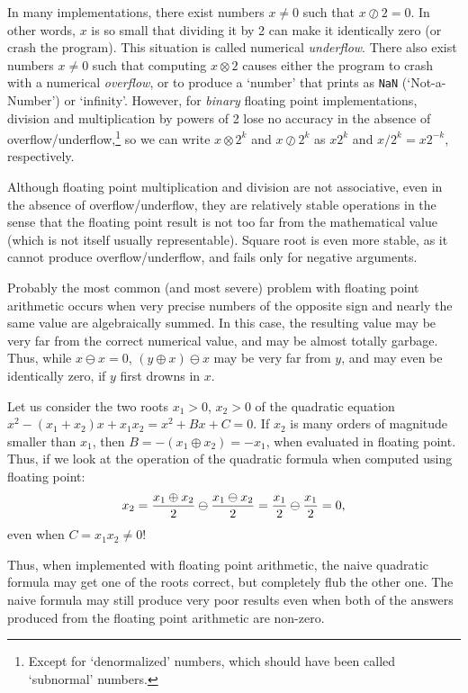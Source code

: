 \documentclass[twocolumn,epsf]{snBaker}
\begin{document}
In many implementations, there exist numbers $x\neq 0$ such that
$x\oslash 2=0$.  In other words, $x$ is so small that dividing it by 2
can make it identically zero (or crash the program).  This situation
is called numerical {\it underflow}.  There also exist numbers $x\neq
0$ such that computing $x\otimes 2$ causes either the program to crash
with a numerical {\it overflow}, or to produce a `number' that prints
as {\tt NaN} (`Not-a-Number') or `infinity'.  However, for {\it binary} floating
point implementations, division and multiplication by powers of 2 lose
no accuracy in the absence of overflow/underflow,\footnote{Except for
`denormalized' numbers, which should have been called `subnormal'
numbers.} so we can write $x\otimes 2^k$ and $x\oslash 2^k$ as $x2^k$
and $x/2^k=x2^{-k}$, respectively.

Although floating point multiplication and division are not
associative, even in the absence of overflow/underflow, they are
relatively stable operations in the sense that the floating point
result is not too far from the mathematical value (which is not
itself usually representable).  Square root is even more stable, as it cannot
produce overflow/underflow, and fails only for negative arguments.

Probably the most common (and most severe) problem with floating point arithmetic occurs
when very precise numbers of the opposite sign and nearly the same
value are algebraically summed.  In this case, the resulting value may
be very far from the correct numerical value, and may be almost
totally garbage.  Thus, while $x\ominus x=0$, $(y\oplus x)\ominus x$
may be very far from $y$, and may even be identically zero, if $y$
first drowns in $x$.

Let us consider the two roots $x_1>0$, $x_2>0$ of the quadratic
equation $x^2-(x_1+x_2)x+x_1x_2=x^2+Bx+C=0$.  If $x_2$ is many orders
of magnitude smaller than $x_1$, then $B=-(x_1\oplus x_2)=-x_1$, when
evaluated in floating point.  Thus, if we look at the operation of the
quadratic formula when computed using floating point:
$$x_2={x_1\oplus x_2\over 2}\ominus{x_1\ominus x_2\over 2}={x_1\over 2}\ominus{x_1\over 2}
=0,$$
even when $C=x_1x_2\neq 0$!

Thus, when implemented with floating point arithmetic, the naive
quadratic formula may get one of the roots correct, but completely
flub the other one.  The naive formula may still produce very poor
results even when both of the answers produced from the floating point
arithmetic are non-zero.
\end{document}
